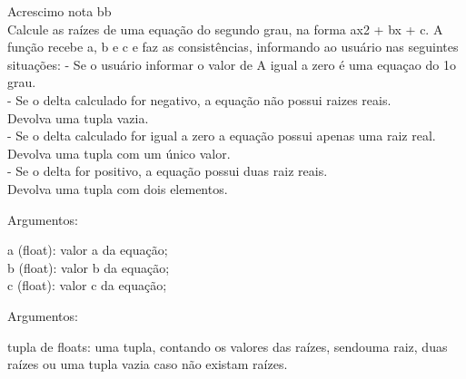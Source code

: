 \documentclass[12pt , a4paper]{article}
\begin{document}
\problem Acrescimo nota bb\\ 
Calcule as raízes de uma equação do segundo grau, na forma ax2 + bx + c. A função recebe a, b e c e faz as consistências, informando ao usuário nas seguintes situações: - Se o usuário informar o valor de A igual a zero é uma equaçao do 1o grau.\\
 - Se o delta calculado for negativo, a equação não possui raizes reais.\\
 Devolva uma tupla vazia.\\
 - Se o delta calculado for igual a zero a equação possui apenas uma raiz real. Devolva uma tupla com um único valor.\\
 - Se o delta for positivo, a equação possui duas raiz reais.\\
 Devolva uma tupla com dois elementos.
\begin{adjustwidth}{1cm}{}
Argumentos:
\begin{adjustwidth}{1cm}{}a (float): valor a da equação;\\
b (float): valor b da equação;\\
c (float): valor c da equação;
\end{adjustwidth}
Argumentos:
\begin{adjustwidth}{1cm}{}tupla de floats: uma tupla, contando os valores das raízes, sendouma raiz, duas raízes ou uma tupla vazia caso não existam raízes.
\end{adjustwidth}
\end{adjustwidth}
\end{document}
